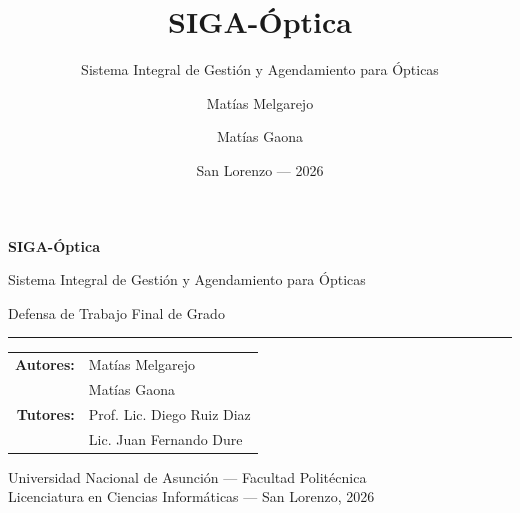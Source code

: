 \documentclass[11pt,aspectratio=169]{beamer}
\title{SIGA-Óptica}
\subtitle{Sistema Integral de Gestión y Agendamiento para Ópticas}
\author{Matías Melgarejo \and Matías Gaona}
\institute{Universidad Nacional de Asunción \\ Facultad Politécnica \\ Licenciatura en Ciencias Informáticas}
\date{San Lorenzo --- 2026}
\begin{document}
{
\begin{frame}[plain]
  \vfill
  \begin{center}
    {\LARGE\bfseries\color{sigaAzul}SIGA-Óptica\par}
    \vspace{4pt}
    {\large Sistema Integral de Gestión y Agendamiento para Ópticas\par}
    \vspace{2pt}
    {\small\color{sigaGris}Defensa de Trabajo Final de Grado\par}
    \vspace{18pt}
    {\color{sigaAzul!30}\rule{0.45\textwidth}{0.8pt}}
    \vspace{14pt}

    \begin{tabular}{rl}
      \small\textbf{Autores:} & \small Matías Melgarejo \\
                              & \small Matías Gaona \\[4pt]
      \small\textbf{Tutores:} & \small Prof. Lic. Diego Ruiz Diaz \\
                              & \small Lic. Juan Fernando Dure \\
    \end{tabular}

    \vspace{16pt}
    {\footnotesize\color{sigaGris}Universidad Nacional de Asunción --- Facultad Politécnica\\
    Licenciatura en Ciencias Informáticas --- San Lorenzo, 2026\par}
  \end{center}
  \vfill
\end{frame}}
\end{document}
